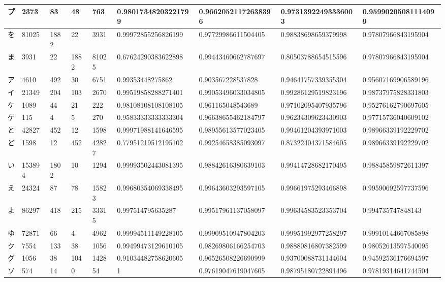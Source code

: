 \begin{table}[H]
\begin{center}
\begin{CJK}{UTF8}{min}
\begin{tabular}{ | l | l | l | l | l | l | l | l | l | }
			プ & 2373 & 83 & 48 & 763 & 0.98017348203221799 & 0.96620521172638396 & 0.97313922493336003 & 0.95990205081114099 \\ \hline
			を & 81025 & 1882 & 22 & 3931 & 0.99972855256826199 & 0.97729986611504405 & 0.98838698659379998 & 0.97807966843195904 \\ \hline
			ま & 3931 & 22 & 1882 & 81025 & 0.67624290383622898 & 0.99443460662787697 & 0.80503788654515596 & 0.97807966843195904 \\ \hline
			ア & 4610 & 492 & 30 & 6751 & 0.99353448275862 & 0.903567228537828 & 0.94641757339355304 & 0.95607169906589196 \\ \hline
			イ & 21349 & 204 & 103 & 2670 & 0.99519858288271401 & 0.99053496033034805 & 0.99286129519823196 & 0.98737975828331803 \\ \hline
			ケ & 1089 & 44 & 21 & 222 & 0.98108108108108105 & 0.961165048543689 & 0.97102095407935796 & 0.95276162790697605 \\ \hline
			ゲ & 115 & 4 & 5 & 270 & 0.95833333333333304 & 0.96638655462184797 & 0.96234309623430903 & 0.97715736040609102 \\ \hline
			と & 42827 & 452 & 12 & 1598 & 0.99971988141646595 & 0.98955613577023405 & 0.99461204393971003 & 0.98966339192229702 \\ \hline
			ど & 1598 & 12 & 452 & 42827 & 0.77951219512195102 & 0.99254658385093097 & 0.87322404371584605 & 0.98966339192229702 \\ \hline
			い & 153894 & 1802 & 10 & 1294 & 0.99993502443081395 & 0.98842616380639103 & 0.99414728682170495 & 0.98845859872611397 \\ \hline
			え & 24324 & 87 & 78 & 15823 & 0.99680354069338495 & 0.99643603293597105 & 0.99661975293466898 & 0.99590692597737596 \\ \hline
			よ & 86297 & 418 & 215 & 33315 & 0.997514795635287 & 0.99517961137058097 & 0.99634583523353704 & 0.994735747848143 \\ \hline
			ゆ & 72871 & 66 & 4 & 4962 & 0.99994511149228105 & 0.99909510947804203 & 0.99951992977258297 & 0.99910144667085898 \\ \hline
			ク & 7554 & 133 & 38 & 1056 & 0.99499473129610105 & 0.98269806166254703 & 0.98880816807382599 & 0.98052613597540095 \\ \hline
			グ & 1056 & 38 & 104 & 1428 & 0.91034482758620605 & 0.96526508226690999 & 0.93700088731144604 & 0.94592536176694597 \\ \hline
			ソ & 574 & 14 & 0 & 54 & 1 & 0.97619047619047605 & 0.98795180722891496 & 0.97819314641744504 \\ \hline

\end{tabular}
\end{CJK}
\end{center}
\end{table}
